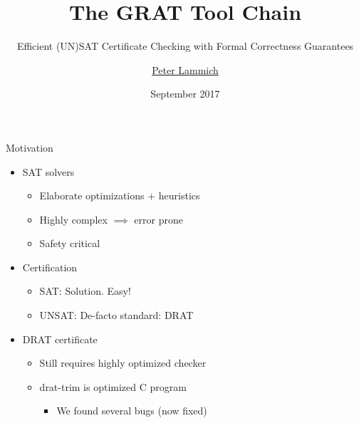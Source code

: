\documentclass[fleqn]{beamer}
\title{The GRAT Tool Chain}
\subtitle{Efficient (UN)SAT Certificate Checking with Formal Correctness Guarantees}
\author[Peter Lammich]{\underline{Peter Lammich}}
\institute[TUM/VT] %
{ TU M\"unchen / Virginia Tech %
}
\date {September 2017}
\begin{document}
% 

\begin{frame}
  \titlepage
\end{frame}


\begin{frame}{Motivation}
  \begin{itemize}
   \item<+-> SAT solvers
    \begin{itemize}
     \item Elaborate optimizations + heuristics
     \item Highly complex $\implies$ error prone
     \item Safety critical
    \end{itemize}
   \item<+-> Certification
    \begin{itemize}
     \item SAT: Solution. Easy!
     \item UNSAT: De-facto standard: DRAT
    \end{itemize}
   \item<+-> DRAT certificate
    \begin{itemize}
     \item Still requires highly optimized checker
     \item drat-trim is optimized C program
      \begin{itemize}
       \item We found several bugs (now fixed)
    

      \end{itemize}
    \end{itemize}
  \end{itemize}
\end{frame}
\end{document}

